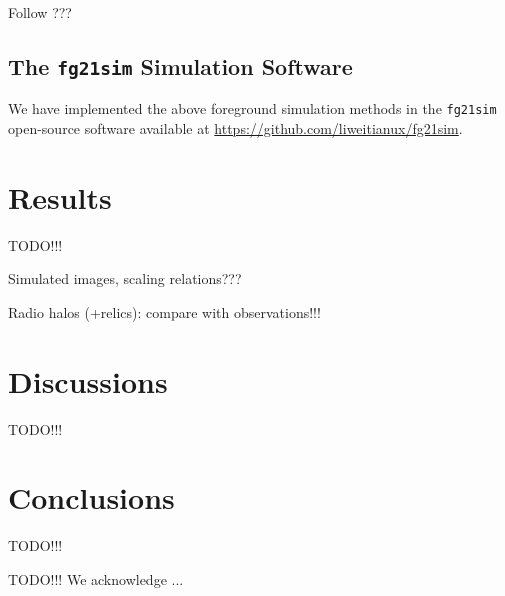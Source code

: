\documentclass[modern]{aastex61}
\begin{document}
Follow \citet{wang2010}???

\subsection{The \texttt{fg21sim} Simulation Software}
\label{sec:fg21sim}

We have implemented the above foreground simulation methods in the
\texttt{fg21sim} open-source software available at
\url{https://github.com/liweitianux/fg21sim}.

\section{Results}
\label{sec:results}

TODO!!!

Simulated images, scaling relations???

Radio halos (+relics): compare with observations!!!


\section{Discussions}
\label{sec:discussions}

TODO!!!


\section{Conclusions}
\label{sec:conclusions}

TODO!!!

\acknowledgments

TODO!!!
We acknowledge ...


%

\vspace{5mm}
\end{document}
